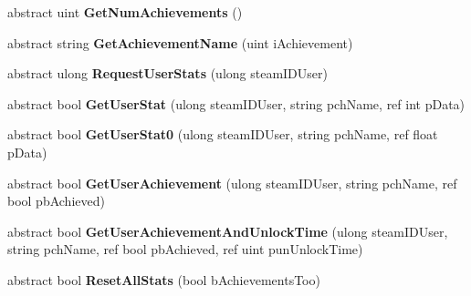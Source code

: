 \begin{DoxyCompactItemize}
abstract uint {\bfseries Get\+Num\+Achievements} ()
\item 
\mbox{\label{class_valve_1_1_steamworks_1_1_i_steam_user_stats_a71acbf56be4aa907324de349df361006}} 
abstract string {\bfseries Get\+Achievement\+Name} (uint i\+Achievement)
\item 
\mbox{\label{class_valve_1_1_steamworks_1_1_i_steam_user_stats_af4446544a7bd757c67755f43e7029398}} 
abstract ulong {\bfseries Request\+User\+Stats} (ulong steam\+I\+D\+User)
\item 
\mbox{\label{class_valve_1_1_steamworks_1_1_i_steam_user_stats_ad6a2936ac451aa38c4400cb437b49187}} 
abstract bool {\bfseries Get\+User\+Stat} (ulong steam\+I\+D\+User, string pch\+Name, ref int p\+Data)
\item 
\mbox{\label{class_valve_1_1_steamworks_1_1_i_steam_user_stats_a2a0e02821ddad18d9582c35b128cc5fa}} 
abstract bool {\bfseries Get\+User\+Stat0} (ulong steam\+I\+D\+User, string pch\+Name, ref float p\+Data)
\item 
\mbox{\label{class_valve_1_1_steamworks_1_1_i_steam_user_stats_a9f0b187dfc7c2addbd270bec3fcdcd96}} 
abstract bool {\bfseries Get\+User\+Achievement} (ulong steam\+I\+D\+User, string pch\+Name, ref bool pb\+Achieved)
\item 
\mbox{\label{class_valve_1_1_steamworks_1_1_i_steam_user_stats_a4b8e0a4a7a6b9eaf5ce8177dbe3528a8}} 
abstract bool {\bfseries Get\+User\+Achievement\+And\+Unlock\+Time} (ulong steam\+I\+D\+User, string pch\+Name, ref bool pb\+Achieved, ref uint pun\+Unlock\+Time)
\item 
\mbox{\label{class_valve_1_1_steamworks_1_1_i_steam_user_stats_a0d898305e8a2e083b9d5cdcac34f8fea}} 
abstract bool {\bfseries Reset\+All\+Stats} (bool b\+Achievements\+Too)
\item 
\mbox{\label{class_valve_1_1_steamworks_1_1_i_steam_user_stats_acbfac9617815a168abcec4753a3c4d32}} 

\end{DoxyCompactItemize}
